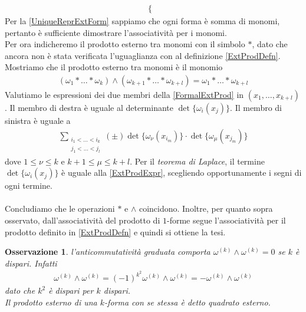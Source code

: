 \documentclass[oneside, 11pt]{amsbook}
\makeatletter
\newcommand{\0}{{(0)}}
\newcommand{\3}{{(3)}}
\theoremstyle{colonplain}
\theoremstyle{colondefinition}
\theoremstyle{colonremark}
\newtheorem{rmk}[thm]{Osservazione}
\numberwithin{equation}{chapter}
\renewcommand{\proofname}{Dimostrazione}
\renewenvironment{proof}[1][\proofname]{\par
  \pushQED{\qed}%
  \normalfont \topsep6\p@\@plus6\p@\relax
  \trivlist
  \item[\hskip\labelsep\bfseries #1:]\ignorespaces
}{%
  \popQED\endtrivlist\@endpefalse
}
\makeatother
\begin{document}
\begin{proof}
\begin{align}
\begin{cases}
    \end{cases} 
\end{align}
Per la \ref{UniqueReprExtForm} sappiamo che ogni forma è somma di monomi, pertanto è sufficiente dimostrare l'associatività per i monomi. \\
Per ora indicheremo il prodotto esterno tra monomi con il simbolo $*$, dato che ancora non è stata verificata l'uguaglianza con al definizione \eqref{ExtProdDefn}. \\
Mostriamo che il prodotto esterno tra monomi è il monomio 
\begin{align}\label{FormalExtProd}
    (\omega_1 * \dots * \omega_k) \wedge (\omega_{k + 1} * \dots * \omega_{k + l}) = \omega_1 * \dots * \omega_{k + l} 
\end{align}
Valutiamo le espressioni dei due membri della \eqref{FormalExtProd} in $(x_1, \dots, x_{k + l})$. Il membro di destra è uguale al determinante $\det\{\omega_i(x_j)\}$. Il membro di sinistra è uguale a 
\begin{align}\label{ExtProdExpr}
    \sum_{\substack{i_1 < \dots < i_k \\ j_1 < \dots < j_l}} (\pm) \det\{\omega_\nu(x_{i_m})\} \cdot \det\{\omega_\mu(x_{j_m})\} 
\end{align}
dove $1 \leq \nu \leq k$ e $k + 1 \leq \mu \leq k + l$. Per il \textit{teorema di Laplace}, il termine $\det\{\omega_i(x_j)\}$ è uguale alla \eqref{ExtProdExpr}, scegliendo opportunamente i segni di ogni termine. \\ \\
Concludiamo che le operazioni $*$ e $\wedge$ coincidono. Inoltre, per quanto sopra osservato, dall'associatività del prodotto di $1$-forme segue l'associatività per il prodotto definito in \eqref{ExtProdDefn} e quindi si ottiene la tesi.
\end{proof}
\begin{rmk} l'anticommutatività graduata comporta $\omega^{(k)} \wedge \omega^{(k)} = 0$ se $k$ è dispari. Infatti
\begin{align}
    \omega^{(k)} \wedge \omega^{(k)} = (-1)^{k^2}\omega^{(k)} \wedge \omega^{(k)} = -\omega^{(k)} \wedge \omega^{(k)} 
\end{align}
dato che $k^2$ è dispari per $k$ dispari. \\
Il prodotto esterno di una $k$-forma con se stessa è detto \textit{quadrato esterno}.
\end{rmk}
\end{document}

